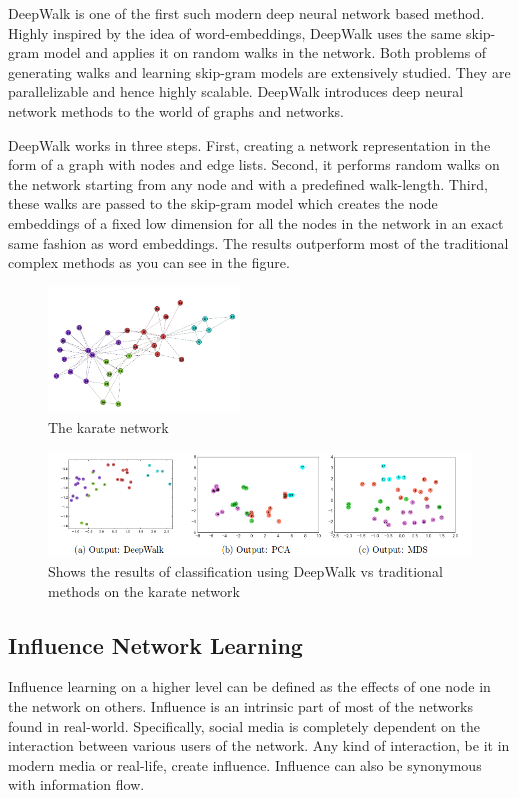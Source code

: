 DeepWalk \cite{perozzi2014deepwalk} is one of the first such modern deep neural network based method. Highly inspired by the idea of word-embeddings, DeepWalk \cite{perozzi2014deepwalk} uses the same skip-gram model and applies it on random walks in the network. Both problems of generating walks and learning skip-gram models are extensively studied. They are parallelizable and hence highly scalable. DeepWalk \cite{perozzi2014deepwalk} introduces deep neural network methods to the world of graphs and networks.

DeepWalk \cite{perozzi2014deepwalk} works in three steps. First, creating a network representation in the form of a graph with nodes and edge lists. Second, it performs random walks on the network starting from any node and with a predefined walk-length. Third, these walks are passed to the skip-gram model which creates the node embeddings of a fixed low dimension for all the nodes in the network in an exact same fashion as word embeddings. The results outperform most of the traditional complex methods as you can see in the figure.

\begin{figure}
\includegraphics[width=2in]{images/karate_net.png}
\caption{The karate network}
\end{figure}

\begin{figure}
\includegraphics[width=7in]{images/karate_net_deepwalk.png}
\caption{Shows the results of classification using DeepWalk vs traditional methods on the karate network}
\end{figure}

\subsection{Influence Network Learning}
Influence learning on a higher level can be defined as the effects of one node in the network on others. Influence is an intrinsic part of most of the networks found in real-world. Specifically, social media is completely dependent on the interaction between various users of the network. Any kind of interaction, be it in modern media or real-life, create influence. Influence can also be synonymous with information flow.

